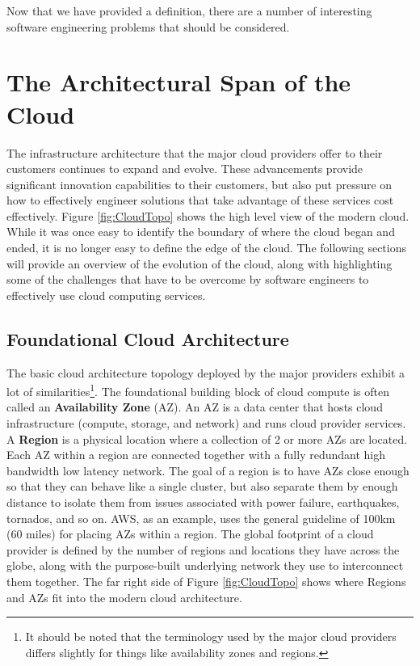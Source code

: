 \documentclass[conference]{IEEEconf}
\begin{document}
Now that we have provided a definition, there are a number of interesting software engineering problems that should be considered. 


\section{The Architectural Span of the Cloud}
\label{sec:CloudArchitecture}
The infrastructure architecture that the major cloud providers offer to their customers continues to expand and evolve.  These advancements provide significant innovation capabilities to their customers, but also put pressure on how to effectively engineer solutions that take advantage of these services cost effectively.  Figure \ref{fig:CloudTopo} shows the high level view of the modern cloud.  While it was once easy to identify the boundary of where the cloud began and ended, it is no longer easy to define the edge of the cloud.  The following sections will provide an overview of the evolution of the cloud, along with highlighting some of the challenges that have to be overcome by software engineers to effectively use cloud computing services.

\subsection{Foundational Cloud Architecture}
The basic cloud architecture topology deployed by the major providers exhibit a lot of similarities\footnote{It should be noted that the terminology used by the major cloud providers differs slightly for things like availability zones and regions.}.  The foundational building block of cloud compute is often called an \textbf{Availability Zone} (AZ).  An AZ is a data center that hosts cloud infrastructure (compute, storage, and network) and runs cloud provider services.  A \textbf{Region} is a physical location where a collection of 2 or more AZs are located.  Each AZ within a region are connected together with a fully redundant high bandwidth low latency network.  The goal of a region is to have AZs close enough so that they can behave like a single cluster, but also separate them by enough distance to isolate them from issues associated with power failure, earthquakes, tornados, and so on.  AWS, as an example, uses the general guideline of 100km (60 miles)\cite{AWS-AZ} for placing AZs within a region. The global footprint of a cloud provider is defined by the number of regions and locations they have across the globe, along with the purpose-built underlying network they use to interconnect them together. The far right side of Figure \ref{fig:CloudTopo} shows where Regions and AZs fit into the modern cloud architecture.
\end{document}
